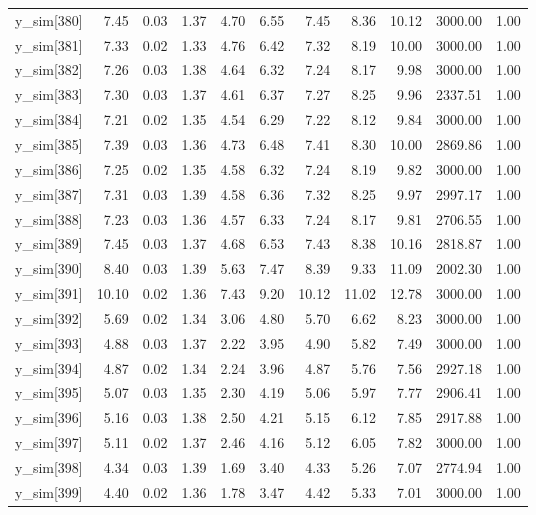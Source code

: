 \begin{table}[ht]
\begin{tabular}{rrrrrrrrrrr}
  y\_sim[380] & 7.45 & 0.03 & 1.37 & 4.70 & 6.55 & 7.45 & 8.36 & 10.12 & 3000.00 & 1.00 \\ 
  y\_sim[381] & 7.33 & 0.02 & 1.33 & 4.76 & 6.42 & 7.32 & 8.19 & 10.00 & 3000.00 & 1.00 \\ 
  y\_sim[382] & 7.26 & 0.03 & 1.38 & 4.64 & 6.32 & 7.24 & 8.17 & 9.98 & 3000.00 & 1.00 \\ 
  y\_sim[383] & 7.30 & 0.03 & 1.37 & 4.61 & 6.37 & 7.27 & 8.25 & 9.96 & 2337.51 & 1.00 \\ 
  y\_sim[384] & 7.21 & 0.02 & 1.35 & 4.54 & 6.29 & 7.22 & 8.12 & 9.84 & 3000.00 & 1.00 \\ 
  y\_sim[385] & 7.39 & 0.03 & 1.36 & 4.73 & 6.48 & 7.41 & 8.30 & 10.00 & 2869.86 & 1.00 \\ 
  y\_sim[386] & 7.25 & 0.02 & 1.35 & 4.58 & 6.32 & 7.24 & 8.19 & 9.82 & 3000.00 & 1.00 \\ 
  y\_sim[387] & 7.31 & 0.03 & 1.39 & 4.58 & 6.36 & 7.32 & 8.25 & 9.97 & 2997.17 & 1.00 \\ 
  y\_sim[388] & 7.23 & 0.03 & 1.36 & 4.57 & 6.33 & 7.24 & 8.17 & 9.81 & 2706.55 & 1.00 \\ 
  y\_sim[389] & 7.45 & 0.03 & 1.37 & 4.68 & 6.53 & 7.43 & 8.38 & 10.16 & 2818.87 & 1.00 \\ 
  y\_sim[390] & 8.40 & 0.03 & 1.39 & 5.63 & 7.47 & 8.39 & 9.33 & 11.09 & 2002.30 & 1.00 \\ 
  y\_sim[391] & 10.10 & 0.02 & 1.36 & 7.43 & 9.20 & 10.12 & 11.02 & 12.78 & 3000.00 & 1.00 \\ 
  y\_sim[392] & 5.69 & 0.02 & 1.34 & 3.06 & 4.80 & 5.70 & 6.62 & 8.23 & 3000.00 & 1.00 \\ 
  y\_sim[393] & 4.88 & 0.03 & 1.37 & 2.22 & 3.95 & 4.90 & 5.82 & 7.49 & 3000.00 & 1.00 \\ 
  y\_sim[394] & 4.87 & 0.02 & 1.34 & 2.24 & 3.96 & 4.87 & 5.76 & 7.56 & 2927.18 & 1.00 \\ 
  y\_sim[395] & 5.07 & 0.03 & 1.35 & 2.30 & 4.19 & 5.06 & 5.97 & 7.77 & 2906.41 & 1.00 \\ 
  y\_sim[396] & 5.16 & 0.03 & 1.38 & 2.50 & 4.21 & 5.15 & 6.12 & 7.85 & 2917.88 & 1.00 \\ 
  y\_sim[397] & 5.11 & 0.02 & 1.37 & 2.46 & 4.16 & 5.12 & 6.05 & 7.82 & 3000.00 & 1.00 \\ 
  y\_sim[398] & 4.34 & 0.03 & 1.39 & 1.69 & 3.40 & 4.33 & 5.26 & 7.07 & 2774.94 & 1.00 \\ 
  y\_sim[399] & 4.40 & 0.02 & 1.36 & 1.78 & 3.47 & 4.42 & 5.33 & 7.01 & 3000.00 & 1.00 \\ 

\end{tabular}
\end{table}
